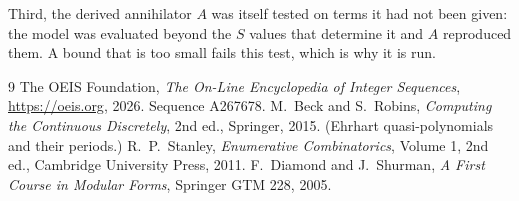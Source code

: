 \documentclass[11pt,a4paper]{article}
\theoremstyle{plain}
\theoremstyle{definition}
\begin{document}
Third, the derived annihilator $A$ was itself tested on terms it had not been given: the model
was evaluated beyond the $S$ values that determine it and $A$ reproduced them. A bound that is
too small fails this test, which is why it is run.

\begin{thebibliography}{9}
 The OEIS Foundation, \emph{The On-Line Encyclopedia of Integer
Sequences}, \url{https://oeis.org}, 2026. Sequence A267678.
 M.~Beck and S.~Robins, \emph{Computing the Continuous Discretely},
2nd ed., Springer, 2015. (Ehrhart quasi-polynomials and their periods.)
 R.~P.~Stanley, \emph{Enumerative Combinatorics}, Volume 1, 2nd ed.,
Cambridge University Press, 2011.
 F.~Diamond and J.~Shurman, \emph{A First Course in Modular Forms},
Springer GTM 228, 2005.
\end{thebibliography}
\end{document}
